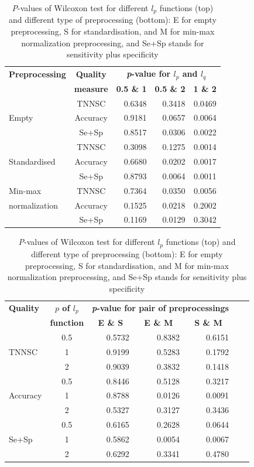 \documentclass[entropy,article,submit,moreauthors,pdftex]{Definitions/mdpi}
\begin{document}
\begin{table}[tb]
\caption{\emph{P}-values of Wilcoxon test for different $l_p$ functions (top) and different type of preprocessing (bottom): E for empty preprocessing, S for standardisation, and M for min-max normalization preprocessing, and Se+Sp stands for sensitivity plus specificity}
\centering
\begin{tabular}{|l|c|r|r|r|}
\hline
\textbf{Preprocessing}&\textbf{Quality}&\multicolumn{3}{c|}{\textbf{\emph{p}-value for $l_p$ and $l_q$}}\\ \cline{3-5}

&\textbf{measure}&\multicolumn{1}{c|}{\textbf{0.5 \& 1}}&\multicolumn{1}{c|}{\textbf{0.5 \& 2}}&\multicolumn{1}{c|}{\textbf{1 \& 2}} \\ \hline

& TNNSC & 0.6348 & 0.3418 & 0.0469\\ \cline{2-5}
Empty & Accuracy & 0.9181 & 0.0657 & 0.0064\\ \cline{2-5}
 & Se+Sp & 0.8517 & 0.0306 & 0.0022\\ \hline
& TNNSC & 0.3098 & 0.1275 & 0.0014\\ \cline{2-5}
Standardised & Accuracy & 0.6680 & 0.0202 & 0.0017 \\ \cline{2-5}
 & Se+Sp & 0.8793 & 0.0064 & 0.0011\\ \hline
Min-max & TNNSC & 0.7364 & 0.0350 & 0.0056\\ \cline{2-5}
normalization & Accuracy & 0.1525 & 0.0218 & 0.2002\\ \cline{2-5}
 & Se+Sp & 0.1169 & 0.0129 & 0.3042\\ \hline

\end{tabular}

\bigskip

\begin{tabular}{|l|c|r|r|r|r|r|}
\hline
\textbf{Quality} & \textbf{$p$ of $l_p$}&\multicolumn{3}{c|}{\textbf{\emph{p}-value for pair of preprocessings}} \\ \cline{3-5}

&\textbf{function}&\multicolumn{1}{c|}{\textbf{E \& S}}&\multicolumn{1}{c|}{\textbf{E \& M}}&\multicolumn{1}{c|}{\textbf{S \& M}} \\ \hline

& 0.5 & 0.5732 & 0.8382 & 0.6151\\ \cline{2-5}
TNNSC & 1 & 0.9199 & 0.5283 & 0.1792\\ \cline{2-5}
& 2 & 0.9039 & 0.3832 & 0.1418\\ \hline
& 0.5 & 0.8446 & 0.5128 & 0.3217\\ \cline{2-5}
Accuracy & 1 & 0.8788 & 0.0126 & 0.0091\\ \cline{2-5}
 & 2 & 0.5327 & 0.3127 & 0.3436\\ \hline
& 0.5 & 0.6165 & 0.2628 & 0.0644\\ \cline{2-5}
Se+Sp & 1 & 0.5862 & 0.0054 & 0.0067\\ \cline{2-5}
 & 2 & 0.6292 & 0.3341 & 0.4780\\ \hline

\end{tabular}
\label{tab:Wilcoxon}
\end{table}
\end{document}
